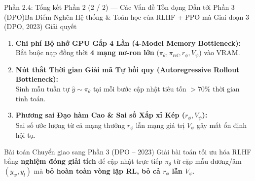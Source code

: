 \begin{frame}{Phần 2.4: Tổng kết Phần 2 (2 / 2) --- Các Vấn đề Tồn đọng Dẫn tới Phần 3 (DPO)}{Ba Điểm Nghẽn Hệ thống \& Toán học của RLHF + PPO mà Giai đoạn 3 (DPO, 2023) Giải quyết}
  \small
  \begin{enumerate}\setlength{\itemsep}{6pt}
    \item \textbf{Chi phí Bộ nhớ GPU Gấp 4 Lần (4-Model Memory Bottleneck):}\\
      \footnotesize Bắt buộc nạp đồng thời \textbf{4 mạng nơ-ron lớn} ($\pi_\theta, \pi_{\text{ref}}, r_\phi, V_\psi$) vào VRAM.
    \item \textbf{Nút thắt Thời gian Giải mã Tự hồi quy (Autoregressive Rollout Bottleneck):}\\
      \footnotesize Sinh mẫu tuần tự $\hat{y} \sim \pi_\theta$ tại mỗi bước cập nhật tiêu tốn $>70\%$ thời gian tính toán.
    \item \textbf{Phương sai Đạo hàm Cao \& Sai số Xấp xỉ Kép ($r_\phi, V_\psi$):}\\
      \footnotesize Sai số ước lượng từ cả mạng thưởng $r_\phi$ lẫn mạng giá trị $V_\psi$ gây mất ổn định hội tụ.
  \end{enumerate}

  \vspace{0.06cm}
  \begin{exampleblock}{Bài toán Chuyển giao sang Phần 3 (DPO -- 2023)}
    \footnotesize
    Giải bài toán tối ưu hóa RLHF bằng \textbf{nghiệm đóng giải tích} để cập nhật trực tiếp $\pi_\theta$ từ cặp mẫu dương/âm $(y_w, y_l)$ mà \textbf{bỏ hoàn toàn vòng lặp RL, bỏ cả $r_\phi$ lẫn $V_\psi$}.
  \end{exampleblock}
\end{frame}
